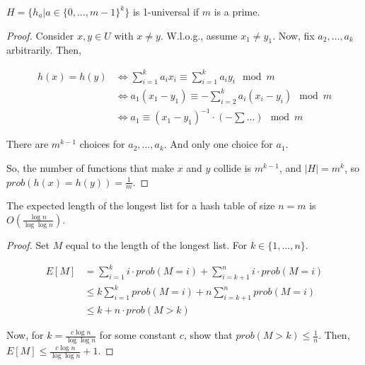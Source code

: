 \begin{mytheorem}
$H = \{h_a | a \in \{0, \ldots, m-1\}^k\}$ is 1-universal if $m$ is a prime.
\end{mytheorem}
\begin{proof}
Consider $x,y \in U$ with $x \neq y$. W.l.o.g., assume $x_1 \neq y_1$. Now, fix $a_2,\ldots, a_k$ arbitrarily. Then,

\begin{align*}
h(x) = h(y) &\iff \sum\limits_{i=1}^k a_i x_i \equiv \sum\limits_{i=1}^k a_i y_i \mod m \\
& \iff a_1(x_1 - y_1) \equiv - \sum\limits_{i=2}^k a_i (x_i - y_i) \mod m \\
& \iff a_1 \equiv (x_1 - y_1)^{-1} \cdot (- \sum \ldots) \mod m
\end{align*}

There are $m^{k-1}$ choices for $a_2, \ldots, a_k$. And only one choice for $a_1$.

So, the number of functions that make $x$ and $y$ collide is $m^{k-1}$, and $|H| = m^k$, so ${prob}(h(x)=h(y)) = \frac{1}{m}$.
\end{proof}

\begin{mytheorem}
The expected length of the longest list for a hash table of size $n = m$ is $O(\frac{\log n}{\log \log n})$.
\end{mytheorem}
\begin{proof}
Set $M$ equal to the length of the longest list. For $k \in \{1, \ldots, n\}$.

\begin{align*}
E[M] &= \sum\limits_{i=1}^k i \cdot {prob}(M=i) + \sum\limits_{i=k+1}^n i \cdot {prob}(M=i) \\
& \le k \sum\limits_{i=1}^k {prob}(M=i) + n \sum\limits_{i = k +1}^n {prob}(M=i) \\
& \le k + n \cdot {prob}(M > k)
\end{align*}

Now, for $k = \frac{c \log n}{\log \log n}$ for some constant $c$, show that ${prob}(M > k) \le \frac{1}{n}$. Then, $E[M] \le \frac{c \log n}{\log \log n} + 1$.
\end{proof}


